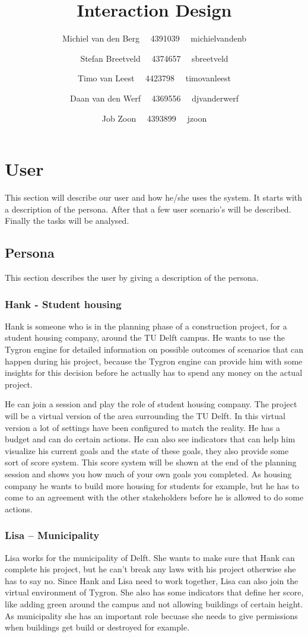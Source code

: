 \documentclass[11pt,a4paper]{article}
\title{Interaction Design}
\author{ 	Michiel van den Berg \ \ 4391039 \ \ michielvandenb
		\and Stefan Breetveld \ \ 4374657 \ \ sbreetveld
  		\and Timo van Leest \ \ 4423798 \ \ timovanleest
		\and Daan van den Werf \ \ 4369556 \ \ djvanderwerf
   		\and Job Zoon \ \ 4393899 \ \ jzoon  }
\begin{document}
\section{User}
This section will describe our user and how he/she uses the system. 
It starts with a description of the persona. 
After that a few user scenario's will be described.
Finally the tasks will be analysed.

\subsection{Persona}
This section describes the user by giving a description of the persona.
\subsubsection*{Hank - Student housing}
Hank is someone who is in the planning phase of a construction project, for a student housing company, around the TU Delft campus. He wants to use the Tygron engine for detailed information on possible outcomes of scenarios that can happen during his project, because the Tygron engine can provide him with some insights for this decision before he actually has to spend any money on the actual project. 

He can join a session and play the role of student housing company. The project will be a virtual version of the area surrounding the TU Delft. In this virtual version a lot of settings have been configured to match the reality. He has a budget and can do certain actions. He can also see indicators that can help him visualize his current goals and the state of these goals, they also provide some sort of score system. This score system will be shown at the end of the planning session and shows you how much of your own goals you completed. As housing company he wants to build more housing for students for example, but he has to come to an agreement with the other stakeholders before he is allowed to do some actions.

\subsubsection*{Lisa – Municipality}
Lisa works for the municipality of Delft. She wants to make sure that Hank can complete his project, but he can’t break any laws with his project otherwise she has to say no. Since Hank and Lisa need to work together, Lisa can also join the virtual environment of Tygron. She also has some indicators that define her score, like adding green around the campus and not allowing buildings of certain height. As municipality she has an important role becuase she needs to give permissions when buildings get build or destroyed for example.
\end{document}
